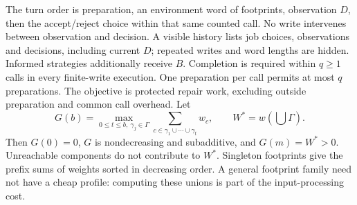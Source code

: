 The turn order is preparation, an environment word of footprints, observation $D$, then the accept/reject choice within that same counted call. No write intervenes between observation and decision. A visible history lists job choices, observations and decisions, including current $D$; repeated writes and word lengths are hidden. Informed strategies additionally receive $B$. Completion is required within $q\ge1$ calls in every finite-write execution. One preparation per call permits at most $q$ preparations. The objective is protected repair work, excluding outside preparation and common call overhead. Let
\[
G(b)=\max_{0\le t\le b,\ \gamma_j\in\Gamma}
       \sum_{c\in\gamma_1\cup\cdots\cup\gamma_t}w_c,
\qquad W^*=w\!\left(\bigcup\Gamma\right).
\]
Then $G(0)=0$, $G$ is nondecreasing and subadditive, and $G(m)=W^*>0$. Unreachable components do not contribute to $W^*$. Singleton footprints give the prefix sums of weights sorted in decreasing order. A general footprint family need not have a cheap profile: computing these unions is part of the input-processing cost.

